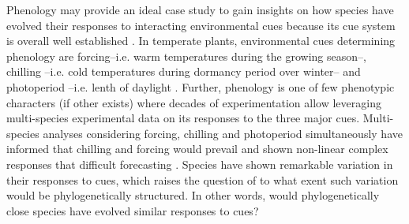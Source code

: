 \documentclass{article}\usepackage[]{graphicx}\usepackage[]{color}
\begin{document}

Phenology may provide an ideal case study to gain insights on how species have evolved their responses to interacting environmental cues because its cue system is overall well established \citep{}. In temperate plants, environmental cues determining phenology are forcing--i.e. warm temperatures during the growing season--, chilling --i.e. cold temperatures during dormancy period over winter-- and photoperiod --i.e. lenth of daylight \citep{}. Further, phenology is one of few phenotypic characters (if other exists) where decades of experimentation allow leveraging multi-species experimental data on its responses to the three major cues. Multi-species analyses considering forcing, chilling and photoperiod simultaneously have informed that chilling and forcing would prevail and shown non-linear complex responses that difficult forecasting \citep{}. Species have shown remarkable variation in their responses to cues, which raises the question of to what exent such variation would be phylogenetically structured. In other words, would phylogenetically close species have evolved similar responses to cues?\\
\end{document}
